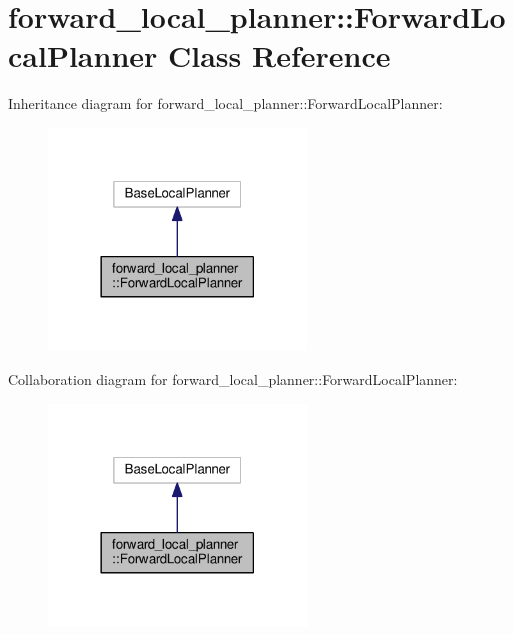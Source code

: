 \hypertarget{classforward__local__planner_1_1ForwardLocalPlanner}{\section{forward\-\_\-local\-\_\-planner\-:\-:Forward\-Local\-Planner Class Reference}
\label{classforward__local__planner_1_1ForwardLocalPlanner}
}


Inheritance diagram for forward\-\_\-local\-\_\-planner\-:\-:Forward\-Local\-Planner\-:
\nopagebreak
\begin{figure}[H]
\begin{center}
\leavevmode
\includegraphics[width=194pt]{classforward__local__planner_1_1ForwardLocalPlanner__inherit__graph}
\end{center}
\end{figure}


Collaboration diagram for forward\-\_\-local\-\_\-planner\-:\-:Forward\-Local\-Planner\-:
\nopagebreak
\begin{figure}[H]
\begin{center}
\leavevmode
\includegraphics[width=194pt]{classforward__local__planner_1_1ForwardLocalPlanner__coll__graph}
\end{center}
\end{figure}

